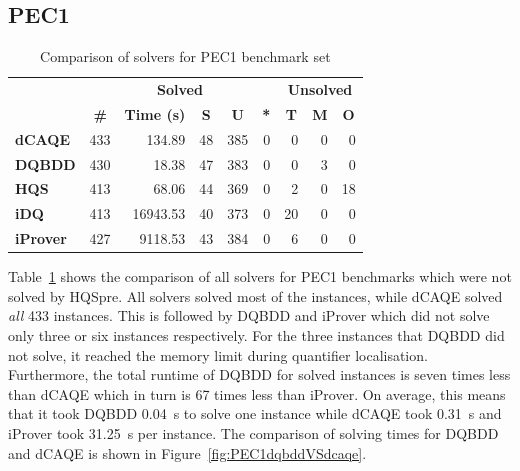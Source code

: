 \documentclass[
  digital, %
  color,
  twoside, %
  table,   %
  nolof,     %
  nolot,     %
]{fithesis3}
\theoremstyle{definition}
\theoremstyle{remark}
\begin{document}
\subsection{PEC1}

\begin{table}[t]
\centering
\caption{Comparison of solvers for PEC1 benchmark set}%
\label{tab:PEC1}
\begin{tabular}{|l|r|r|r|r|r|r|r|r|}
\hline
\multicolumn{1}{|c|}{}                                  & \multicolumn{5}{c|}{\textbf{Solved}}                                                                                                                                        & \multicolumn{3}{c|}{\textbf{Unsolved}}                                                                 \\  \hhline{~*{8}{-}}
\multicolumn{1}{|c|}{\multirow{-2}{*}{\textbf{Solver}}} & \multicolumn{1}{c|}{\textbf{\#}} & \multicolumn{1}{c|}{\textbf{Time (s)}} & \multicolumn{1}{c|}{\textbf{S}} & \multicolumn{1}{c|}{\textbf{U}} & \multicolumn{1}{c|}{\textbf{*}} & \multicolumn{1}{c|}{\textbf{T}} & \multicolumn{1}{c|}{\textbf{M}} & \multicolumn{1}{c|}{\textbf{O}} \\ \hline
\textbf{dCAQE} & \num{433} & \num{134.89} & \num{48} & \num{385} & \num{0} & \num{0} & \num{0} & \num{0} \\ \hline
\textbf{DQBDD} & \num{430} & \num{18.38} & \num{47} & \num{383} & \num{0} & \num{0} & \num{3} & \num{0} \\ \hline
\textbf{HQS} & \num{413} & \num{68.06} & \num{44} & \num{369} & \num{0} & \num{2} & \num{0} & \num{18} \\ \hline
\textbf{iDQ} & \num{413} & \num{16943.53} & \num{40} & \num{373} & \num{0} & \num{20} & \num{0} & \num{0} \\ \hline
\textbf{iProver} & \num{427} & \num{9118.53} & \num{43} & \num{384} & \num{0} & \num{6} & \num{0} & \num{0} \\ \hline
\end{tabular}
\end{table}

Table~\ref{tab:PEC1} shows the comparison of all solvers for PEC1 benchmarks which were not solved by HQSpre. All solvers solved most of the instances, while dCAQE solved \emph{all} 433 instances. This is followed by DQBDD and iProver which did not solve only three or six instances respectively. For the three instances that DQBDD did not solve, it reached the memory limit during quantifier localisation. Furthermore, the total runtime of DQBDD for solved instances is seven times less than dCAQE which in turn is 67 times less than iProver. On average, this means that it took DQBDD \SI{0.04}{s} to solve one instance while dCAQE took \SI{0.31}{s} and iProver took \SI{31.25}{s} per instance. The comparison of solving times for DQBDD and dCAQE is shown in Figure~\ref{fig:PEC1dqbddVSdcaqe}.
\end{document}
